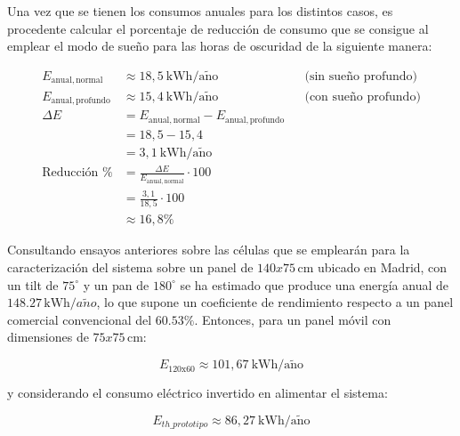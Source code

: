 Una vez que se tienen los consumos anuales para los distintos casos, es procedente calcular el porcentaje de reducción de consumo que se consigue al emplear el modo de sueño para las horas de oscuridad de la siguiente manera:

\begin{align}
	E_{\mathrm{anual, normal}} &\approx 18,5~\mathrm{kWh/a\tilde{n}o} && \text{(sin sueño profundo)} \\
	E_{\mathrm{anual, profundo}} &\approx 15,4~\mathrm{kWh/a\tilde{n}o} && \text{(con sueño profundo)} \\
	\Delta E &= E_{\mathrm{anual, normal}} - E_{\mathrm{anual, profundo}} \\
	&= 18,5 - 15,4 \\
	&= 3,1~\mathrm{kWh/a\tilde{n}o} \\
	\text{Reducción \%} &= \frac{\Delta E}{E_{\mathrm{anual, normal}}} \cdot 100 \\
	&= \frac{3,1}{18,5} \cdot 100 \\
	&\approx 16,8\%
\end{align}


Consultando ensayos anteriores sobre las células que se emplearán para la caracterización del sistema sobre un panel de $140x75\, \mathrm{cm}$ ubicado en Madrid, con un tilt de $75^\circ$ y un pan de $180^\circ$  se ha estimado que produce una energía anual de $148.27\, \mathrm{kWh}\slash a\tilde{n}o$, lo que supone un coeficiente de rendimiento respecto a un panel comercial convencional del $60.53\%$. Entonces, para un panel móvil con dimensiones de $75x75\, \mathrm{cm}$:

\begin{equation}
	E_{\mathrm{120x60}} \approx 101,67~\mathrm{kWh/a\tilde{n}o}
\end{equation}

y considerando el consumo eléctrico invertido en alimentar el sistema:

\begin{equation}
	E_{th\_prototipo} \approx 86,27~\mathrm{kWh/a\tilde{n}o}
\end{equation}
 
 
 


